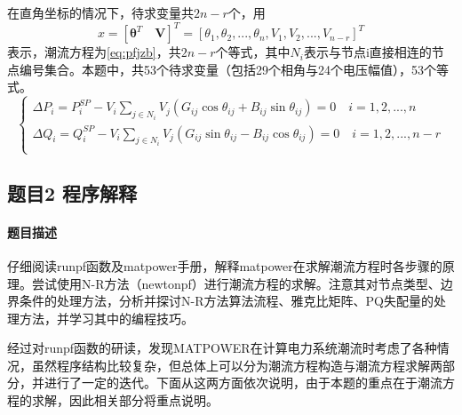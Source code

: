 \documentclass[a4paper,12pt]{article}
\newcommand{\vect}[1]{\boldsymbol{#1}}
\begin{document}
    在直角坐标的情况下，待求变量共$2n-r$个，用
    $$x=[\vect{\theta}^T \quad \vect{V}]^T=[\theta_1,\theta_2,...,\theta_n,V_1,V_2,...,V_{n-r}]^T$$ 表示，潮流方程为\cref{eq:pfjzb}，共$2n-r$个等式，其中$N_i$表示与节点i直接相连的节点编号集合。本题中，共53个待求变量（包括29个相角与24个电压幅值），53个等式。
    \begin{equation}
      \label{eq:pfjzb}
      \begin{cases}
        \Delta P_i = P^{SP}_i - V_i \sum_{j\in N_i}V_j(G_{ij}\cos \theta_{ij}+B_{ij}\sin \theta_{ij}) = 0 \quad i=1,2,...,n\\
        \Delta Q_i = Q^{SP}_i - V_i \sum_{j\in N_i}V_j(G_{ij}\sin \theta_{ij}-B_{ij}\cos \theta_{ij}) = 0 \quad i = 1,2,...,n-r\\
      \end{cases}
    \end{equation}

    \subsection{题目2 程序解释}
    \paragraph{题目描述} 仔细阅读runpf函数及matpower手册，解释matpower在求解潮流方程时各步骤的原理。尝试使用N-R方法（newtonpf）进行潮流方程的求解。注意其对节点类型、边界条件的处理方法，分析并探讨N-R方法算法流程、雅克比矩阵、PQ失配量的处理方法，并学习其中的编程技巧。

    经过对runpf函数的研读，发现MATPOWER在计算电力系统潮流时考虑了各种情况，虽然程序结构比较复杂，但总体上可以分为潮流方程构造与潮流方程求解两部分，并进行了一定的迭代。下面从这两方面依次说明，由于本题的重点在于潮流方程的求解，因此相关部分将重点说明。
\end{document}
